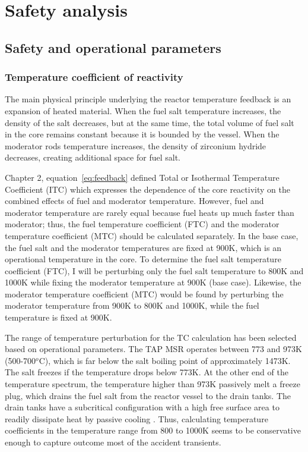 \chapter[Safety analysis]{Safety analysis}

\section{Safety and operational parameters}

\subsection{Temperature coefficient of reactivity}
The main physical principle underlying the reactor temperature feedback is an 
expansion of heated material. When the fuel salt temperature increases, the 
density of the salt decreases, but at the same time, the total volume of fuel 
salt in the core remains constant because it is bounded by the vessel. When 
the moderator rods temperature increases, the density of zirconium hydride 
decreases, creating additional space for fuel salt. 

Chapter 2, equation~\ref{eq:feedback} defined Total or Isothermal Temperature 
Coefficient (ITC) which expresses the dependence of the core reactivity on the 
combined effects of fuel and moderator temperature. However, fuel and 
moderator temperature are rarely equal because fuel heats up much faster than 
moderator; thus, the fuel temperature coefficient (FTC) and the moderator 
temperature coefficient (MTC) should be calculated separately. In the base 
case, the fuel salt and the moderator temperatures are fixed at 900K, which is 
an operational temperature in the core. To determine the fuel salt temperature 
coefficient (FTC), I will be perturbing only the fuel salt temperature to 800K 
and 1000K while fixing the moderator temperature at 900K (base case).  
Likewise, the moderator temperature coefficient (MTC) would be found by 
perturbing the moderator temperature from 900K to 800K and 1000K, while the 
fuel temperature is fixed at 900K. 

The range of temperature perturbation for the TC calculation has been selected 
based on operational parameters. The \gls{TAP} \gls{MSR} operates between 773 
and 973K (500-700$^o$C), which is far below the salt boiling point of 
approximately 1473K. The salt freezes if the temperature drops below 773K. At 
the other end of the temperature spectrum, the temperature higher than 973K 
passively melt a freeze plug, which drains the fuel salt from the reactor 
vessel to the drain tanks. The drain tanks have a subcritical configuration 
with a high free surface area to readily dissipate heat by passive cooling 
\cite{transatomic_power_corporation_technical_2016}. Thus, calculating 
temperature coefficients in the temperature range from 800 to 1000K seems to 
be conservative enough to capture outcome most of the accident transients.

